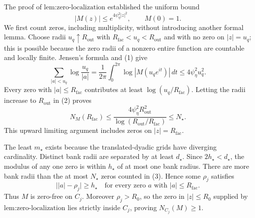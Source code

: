 The proof of \(\text{lem:zero-localization}\) established the uniform bound
\[
 |M(z)|\le e^{4\psi_{\eta}^2|z|^2},\qquad M(0)=1. \tag{1}
\]
We first count zeros, including multiplicity, without introducing another formal lemma.  Choose radii \(u_q\uparrow R_{\mathrm{out}}\) with \(R_{\mathrm{fac}}<u_q<R_{\mathrm{out}}\) and with no zero on \(|z|=u_q\); this is possible because the zero radii of a nonzero entire function are countable and locally finite.  Jensen's formula and (1) give
\[
 \sum_{|a|<u_q}\log\frac{u_q}{|a|}
 =\frac1{2\pi}\int_0^{2\pi}\log|M(u_qe^{it})|\,dt
 \le4\psi_{\eta}^2u_q^2. \tag{2}
\]
Every zero with \(|a|\le R_{\mathrm{fac}}\) contributes at least \(\log(u_q/R_{\mathrm{fac}})\).  Letting the radii increase to \(R_{\mathrm{out}}\) in (2) proves
\[
 N_M(R_{\mathrm{fac}})
 \le
 \frac{4\psi_{\eta}^2R_{\mathrm{out}}^2}
      {\log(R_{\mathrm{out}}/R_{\mathrm{fac}})}
 \le N_{\star}. \tag{3}
\]
This upward limiting argument includes zeros on \(|z|=R_{\mathrm{fac}}\).

The least \(m_{\star}\) exists because the translated-dyadic grids have diverging cardinality.  Distinct bank radii are separated by at least \(d_{\star}\).  Since \(2h_{\star}<d_{\star}\), the modulus of any one zero is within \(h_{\star}\) of at most one bank radius.  There are more bank radii than the at most \(N_{\star}\) zeros counted in (3).  Hence some \(\rho_j\) satisfies
\[
 \bigl||a|-\rho_j\bigr|\ge h_{\star}
 \quad\text{for every zero }a\text{ with }|a|\le R_{\mathrm{fac}}. \tag{4}
\]
Thus \(M\) is zero-free on \(C_j\).  Moreover \(\rho_j>R_0\), so the zero in \(|z|\le R_0\) supplied by \(\text{lem:zero-localization}\) lies strictly inside \(C_j\), proving \(N_{C_j}(M)\ge1\).

